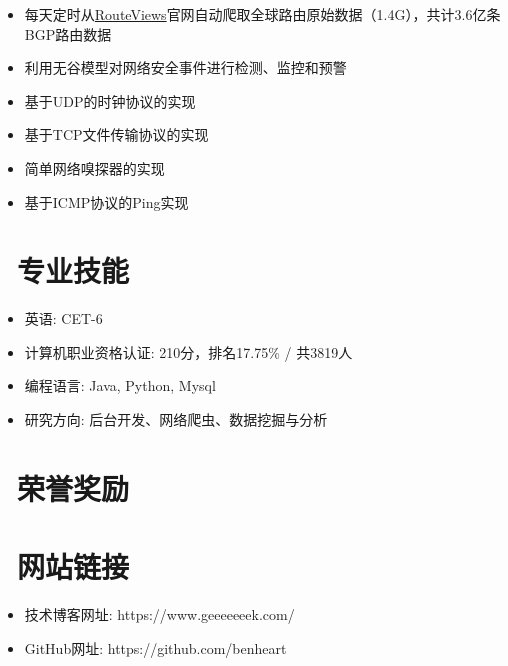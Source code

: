 \documentclass{resume}
\begin{document}
    \begin{onehalfspacing}
        \begin{itemize}
            \item 每天定时从\href{http://www.routeviews.org}{RouteViews}官网自动爬取全球路由原始数据（1.4G），共计3.6亿条BGP路由数据
            \item 利用无谷模型对网络安全事件进行检测、监控和预警
        \end{itemize}
    \end{onehalfspacing}

    \begin{onehalfspacing}
        \begin{itemize}
            \item 基于UDP的时钟协议的实现
            \item 基于TCP文件传输协议的实现
            \item 简单网络嗅探器的实现
            \item 基于ICMP协议的Ping实现
        \end{itemize}
    \end{onehalfspacing}
    \blankline{ }

    \section{\faCogs\ 专业技能}
    \begin{itemize}[parsep=0.5ex]
        \item 英语: CET-6
        \item 计算机职业资格认证: 210分，排名17.75\% / 共3819人
        \item 编程语言: Java, Python, Mysql
        \item 研究方向: 后台开发、网络爬虫、数据挖掘与分析
    \end{itemize}
    \blankline{ }

    \section{\faTrophy\ 荣誉奖励}
    \blankline{ }

    \section{\faLink\ 网站链接}
    \begin{itemize}[parsep=0.5ex]
        \item 技术博客网址: https://www.geeeeeeek.com/
        \item GitHub网址: https://github.com/benheart
    \end{itemize}
\end{document}
